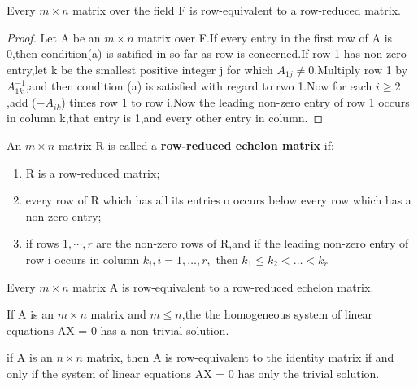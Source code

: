 \begin{theorem}
	Every $m \times n$ matrix over the field F is row-equivalent to a row-reduced matrix.
\end{theorem}
\begin{proof}
  
  Let A be an $m \times n$ matrix over F.If every entry in the first row of A is 0,then condition(a) is satified in so far as row is concerned.If row 1 has non-zero entry,let k be the smallest positive integer j for which $A_{1j} \neq 0$.Multiply row 1 by $A_{1k}^{-1}$,and then condition (a) is satisfied with regard to rwo 1.Now for each $i \geq 2$,add ($-A_{ik}^{}$) times row 1 to  row i,Now the leading non-zero entry of row 1 occurs in column k,that entry is 1,and every other entry in column.
  
\end{proof}

\begin{definition}
	An $m \times n$ matrix R is called a \textbf{row-reduced echelon matrix} if:
	\begin{enumerate}
		\item R is a row-reduced matrix;
		\item every row of R which has all its entries o occurs below every row which has a non-zero entry;
		\item if rows $1,\cdots ,r$ are the non-zero rows of R,and if the leading non-zero entry of row i occurs in column $k_i, i = 1,\dots,r,$ then $k_1 \leq k_2 <\dots<k_r$

	\end{enumerate}

\end{definition}

\begin{theorem}
	Every $m \times n$ matrix A is row-equivalent to a row-reduced echelon matrix.
\end{theorem}
\newpage
\begin{theorem}
	If A is an $m \times n$ matrix and $m \leq n$,the the homogeneous system of linear equations AX = 0 has a non-trivial solution.
\end{theorem}




\begin{theorem}
	if A is an $n \times n$ matrix, then A is row-equivalent to the identity matrix if and only if the system of linear equations AX = 0 has only the trivial solution.
\end{theorem}

